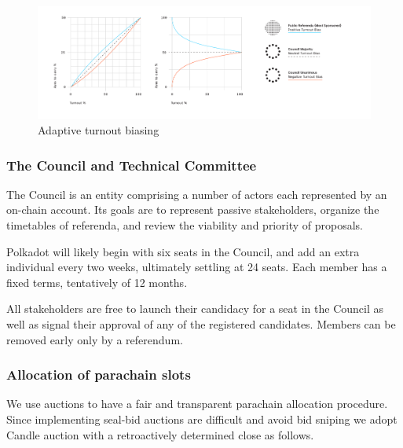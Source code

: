 \begin{figure}[h!]
  \centering
  \includegraphics[width=1.1\textwidth]{images/Turnout-Bias.png}
  \caption{Adaptive turnout biasing }
    \label{fig:biasing}
\end{figure}

\subsubsection{The Council and Technical Committee}\label{s:council}

The Council is an entity comprising a number of actors each represented by an on-chain account. Its goals are to represent passive stakeholders, organize the timetables of referenda, and review the viability and priority of proposals.

Polkadot will likely begin with six seats in the Council, and add an extra individual every two weeks, ultimately settling at 24 seats. Each member has a fixed terms, tentatively of 12 months. 

 All stakeholders are free to launch their candidacy for a seat in the Council as well as signal their approval of any of the registered candidates. Members can be removed early only by a referendum.

\subsubsection{Allocation of parachain slots}\label{s:pAllocation}

We use auctions to have a fair and transparent parachain allocation procedure.
Since implementing seal-bid auctions are difficult and  avoid bid sniping\eray{}{,} we adopt  Candle auction \cite{Fuellbrunn:2012:CandleAuction} with a retroactively determined close as follows.


